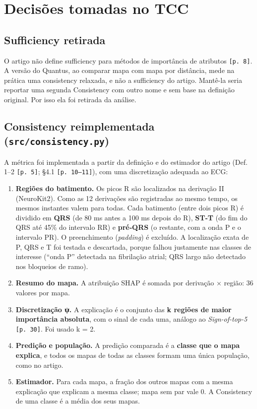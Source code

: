 \documentclass[11pt,a4paper]{article}
\begin{document}
\section{Decisões tomadas no TCC}

\subsection{Sufficiency retirada}
O artigo não define sufficiency para métodos de importância de atributos \texttt{[p. 8]}. A versão do Quantus, ao comparar mapa com mapa por distância, mede na prática uma consistency relaxada, e não a sufficiency do artigo. Mantê-la seria reportar uma segunda Consistency com outro nome e sem base na definição original. Por isso ela foi retirada da análise.

\subsection{Consistency reimplementada (\texttt{src/consistency.py})}
A métrica foi implementada a partir da definição e do estimador do artigo (Def. 1–2 \texttt{[p. 5]}; §4.1 \texttt{[p. 10–11]}), com uma discretização adequada ao ECG:
\begin{enumerate}
\item \textbf{Regiões do batimento.} Os picos R são localizados na derivação II (NeuroKit2). Como as 12 derivações são registradas ao mesmo tempo, os mesmos instantes valem para todas. Cada batimento (entre dois picos R) é dividido em \textbf{QRS} (de 80 ms antes a 100 ms depois do R), \textbf{ST‑T} (do fim do QRS até 45\% do intervalo RR) e \textbf{pré‑QRS} (o restante, com a onda P e o intervalo PR). O preenchimento (\textit{padding}) é excluído. A localização exata de P, QRS e T foi testada e descartada, porque falhou justamente nas classes de interesse (“onda P” detectada na fibrilação atrial; QRS largo não detectado nos bloqueios de ramo).
\item \textbf{Resumo do mapa.} A atribuição SHAP é somada por derivação × região: 36 valores por mapa.
\item \textbf{Discretização ψ.} A explicação é o conjunto das \textbf{k regiões de maior importância absoluta}, com o sinal de cada uma, análogo ao \textit{Sign-of-top-5} \texttt{[p. 30]}. Foi usado k = 2.
\item \textbf{Predição e população.} A predição comparada é a \textbf{classe que o mapa explica}, e todos os mapas de todas as classes formam uma única população, como no artigo.
\item \textbf{Estimador.} Para cada mapa, a fração dos outros mapas com a mesma explicação que explicam a mesma classe; mapa sem par vale 0. A Consistency de uma classe é a média dos seus mapas.
\end{enumerate}
\end{document}
